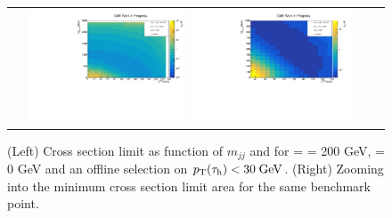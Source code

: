 \begin{figure}[tbh!]
	\centering
	\begin{tabular}{cc}
		\includegraphics[width=0.45\textwidth]{analysis/pics/JetInvMass_vs_MET_xsec_chi200_lsp000_taupt30.pdf}
		\includegraphics[width=0.45\textwidth]{analysis/pics/JetInvMass_vs_MET_xsec_chi200_lsp000_taupt30_zoom.pdf}
	\end{tabular}
	\caption{(Left) Cross section limit as function of $m_{jj}$ and \met for \charginopm = \neutralinotwo = 200 GeV, \neutralinoone = 0 GeV and an offline selection on $p_{\text{T}}(\tau_{\text{h}}) <  30\;\text{Ge}\kern-0.06667em\text{V}$. (Right) Zooming into the minimum cross section limit area for the same benchmark point.}
	\label{fig::JetInvMass_vs_MET_xsec_chi200_lsp000_taupt30}
\end{figure}

